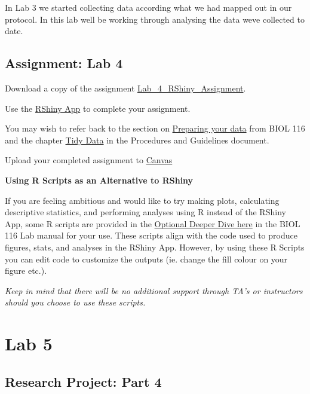 \documentclass[
]{book}
\begin{document}
In Lab 3 we started collecting data according what we had mapped out in our protocol. In this lab we\textquotesingle ll be working through analysing the data we\textquotesingle ve collected to date.

\hypertarget{assignment-lab-4}{%
\chapter*{Assignment: Lab 4}\label{assignment-lab-4}}

Download a copy of the assignment \href{https://osf.io/download/j72q9}{Lab\_4\_RShiny\_Assignment}.

Use the \href{https://openscience.ok.ubc.ca/shiny/BIOL-116/}{RShiny App} to complete your assignment.

You may wish to refer back to the section on \href{https://ubco-biology.github.io/BIOL-116-Lab-Manual/preparing-your-data.html}{Preparing your data} from BIOL 116 and the chapter \href{https://ubco-biology.github.io/Procedures-and-Guidelines/tidy-data.html}{Tidy Data} in the Procedures and Guidelines document.

Upload your completed assignment to \href{https://canvas.ubc.ca/}{Canvas}

\textbf{Using R Scripts as an Alternative to RShiny}

If you are feeling ambitious and would like to try making plots, calculating descriptive statistics, and performing analyses using R instead of the RShiny App, some R scripts are provided in the \href{https://ubco-biology.github.io/BIOL-116-Lab-Manual/lab-7-activity.html}{Optional Deeper Dive here} in the BIOL 116 Lab manual for your use. These scripts align with the code used to produce figures, stats, and analyses in the RShiny App. However, by using these R Scripts you can edit code to customize the outputs (ie. change the fill colour on your figure etc.).

\emph{Keep in mind that there will be no additional support through TA's or instructors should you choose to use these scripts.}

\hypertarget{part-lab-5}{%
\part*{Lab 5}\label{part-lab-5}}

\hypertarget{research-project-part-4}{%
\chapter*{Research Project: Part 4}\label{research-project-part-4}}
\end{document}
